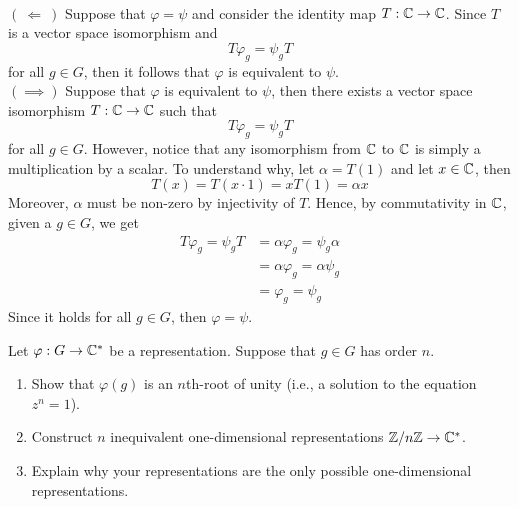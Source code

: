 \begin{solution}
    \\ $( \ \Longleftarrow \ )$ Suppose that $\varphi = \psi$ and consider the identity map $T : \mathbb{C} \to \mathbb{C}$. Since $T$ is a vector space isomorphism and
    $$T \varphi_g = \psi_g T$$
    for all $g \in G$, then it follows that $\varphi$ is equivalent to $\psi$. \\
    $(\implies)$ Suppose that $\varphi$ is equivalent to $\psi$, then there exists a vector space isomorphism $T : \mathbb{C} \to \mathbb{C}$ such that
    $$T \varphi_g = \psi_g T$$
    for all $g \in G$. However, notice that any isomorphism from $\mathbb{C}$ to $\mathbb{C}$ is simply a multiplication by a scalar. To understand why, let $\alpha = T(1)$ and let $x \in \mathbb{C}$, then
    $$T(x) = T(x\cdot 1) = xT(1) = \alpha x$$
    Moreover, $\alpha$ must be non-zero by injectivity of $T$. Hence, by commutativity in $\mathbb{C}$, given a $g \in G$, we get 
    \begin{align*}
        T \varphi_g = \psi_g T &= \alpha \varphi_g = \psi_g \alpha \\
        &= \alpha \varphi_g = \alpha \psi_g \\
        &= \varphi_g = \psi_g
    \end{align*}
    Since it holds for all $g \in G$, then $\varphi = \psi$. \\
\end{solution}

\begin{exercise}
    Let $\varphi : G \to \mathbb{C}^*$ be a representation. Suppose that $g \in G$ has order $n$.
    \begin{enumerate}
        \item Show that $\varphi(g)$ is an $n$th-root of unity (i.e., a solution to the equation $z^n = 1$).
        \item Construct $n$ inequivalent one-dimensional representations $\mathbb{Z}/n\mathbb{Z} \to \mathbb{C}^*$.
        \item Explain why your representations are the only possible one-dimensional representations. \\
    \end{enumerate}
\end{exercise}

